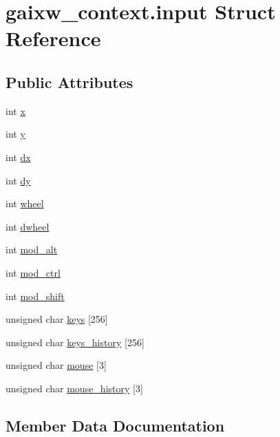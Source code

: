 \hypertarget{structgaixw__context_8input}{}\section{gaixw\+\_\+context.\+input Struct Reference}
\label{structgaixw__context_8input}
\subsection*{Public Attributes}
\begin{DoxyCompactItemize}
\item 
int \hyperlink{structgaixw__context_8input_a9dd4e461268c8034f5c8564e155c67a6}{x}
\item 
int \hyperlink{structgaixw__context_8input_a415290769594460e2e485922904f345d}{y}
\item 
int \hyperlink{structgaixw__context_8input_aacd2b09d39705a84bff035c18c9faea9}{dx}
\item 
int \hyperlink{structgaixw__context_8input_a8e7dd5d3e76aa952e21999a5537dcffb}{dy}
\item 
int \hyperlink{structgaixw__context_8input_a5eda0ea98768e91b815fa6667e4f0178}{wheel}
\item 
int \hyperlink{structgaixw__context_8input_ab2be4b98393de5f1a2072eef32771a94}{dwheel}
\item 
int \hyperlink{structgaixw__context_8input_a7f3c55f8c7e84302c018a3de227f1d9c}{mod\+\_\+alt}
\item 
int \hyperlink{structgaixw__context_8input_a5de65897a9c6e86d91e86c9b4d150950}{mod\+\_\+ctrl}
\item 
int \hyperlink{structgaixw__context_8input_a162a416d033dc19950ed93eaddc649fb}{mod\+\_\+shift}
\item 
unsigned char \hyperlink{structgaixw__context_8input_a5ba83f625856f86f98a3f74c3d5bed00}{keys} \mbox{[}256\mbox{]}
\item 
unsigned char \hyperlink{structgaixw__context_8input_a9b2c9cb76f81f83e354bac549f277e90}{keys\+\_\+history} \mbox{[}256\mbox{]}
\item 
unsigned char \hyperlink{structgaixw__context_8input_aa737b862a7db9aced32f9fd60ee3a26f}{mouse} \mbox{[}3\mbox{]}
\item 
unsigned char \hyperlink{structgaixw__context_8input_a2229a0dc6414d79e7b576f1a26231136}{mouse\+\_\+history} \mbox{[}3\mbox{]}
\end{DoxyCompactItemize}


\subsection{Member Data Documentation}
\mbox{\label{structgaixw__context_8input_ab2be4b98393de5f1a2072eef32771a94}} 
